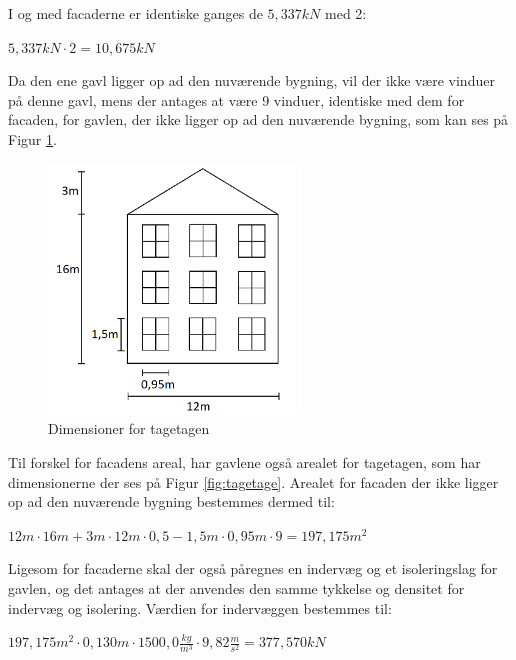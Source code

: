 I og med facaderne er identiske ganges de $5,\!337 kN$ med 2:
\begin{center}
	$5,\!337 kN\cdot 2=10,\!675 kN$
\end{center}

Da den ene gavl ligger op ad den nuværende bygning, vil der ikke være vinduer på denne gavl, mens der antages at være 9 vinduer, identiske med dem for facaden, for gavlen, der ikke ligger op ad den nuværende bygning, som kan ses på Figur \ref{fig:gavl}.

\begin{figure}[htbp]
	\centering
	\includegraphics[width=0.6\textwidth]{billeder/facadevestellerost.png}
	\caption{Dimensioner for tagetagen}
	\label{fig:gavl}
\end{figure}

Til forskel for facadens areal, har gavlene også arealet for tagetagen, som har dimensionerne der ses på Figur \ref{fig:tagetage}. Arealet for facaden der ikke ligger op ad den nuværende bygning bestemmes dermed til:
\begin{center}
	$12 m\cdot 16 m + 3 m\cdot 12 m \cdot 0,\!5 - 1,\!5 m\cdot 0,\!95 m \cdot 9=197,\!175 m^2$
\end{center}

Ligesom for facaderne skal der også påregnes en indervæg og et isoleringslag for gavlen, og det antages at der anvendes den samme tykkelse og densitet for indervæg og isolering.
\newline
\newline
Værdien for indervæggen bestemmes til:
\begin{center}
	$197,\!175 m^2\cdot 0,\!130 m\cdot 1500,\!0 \frac{kg}{m^3}\cdot 9,\!82 \frac{m}{s^2}=377,\!570 kN$
\end{center}

